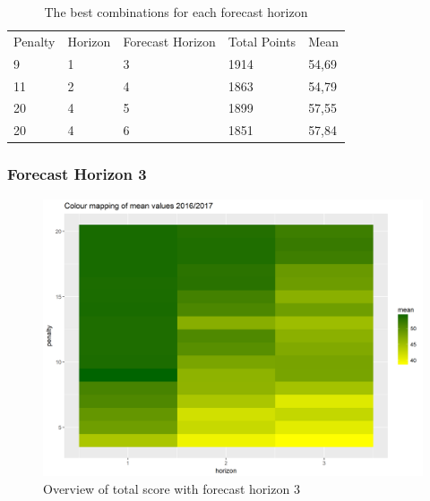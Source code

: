 \begin{table}[H]
\centering
\caption{The best combinations for each forecast horizon}
\label{tab:top_5}
\begin{tabular}{lllll}
Penalty & Horizon & Forecast Horizon & Total Points & Mean  \\
9       & 1       & 3                & 1914         & 54,69 \\
11      & 2       & 4                & 1863         & 54,79 \\
20      & 4       & 5                & 1899         & 57,55 \\
20      & 4       & 6                & 1851         & 57,84
\end{tabular}
\end{table}

\subsubsection{Forecast Horizon 3}

\begin{figure}[H]
    \centering
    \includegraphics[scale=0.55]{fig/chapter_6/paramter_choice_3.png}
    \caption{Overview of total score with forecast horizon 3}
\label{fig:parameters_f_hor_3}    
\end{figure}

